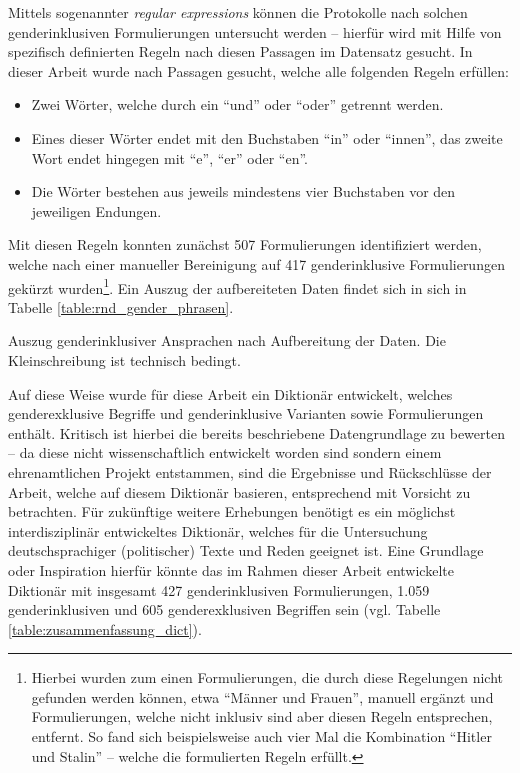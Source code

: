 \documentclass[12pt, 
    twoside=false, 
    bibliography=totoc, 
    numbers=endperiod, 
    headings=normal, 
    toc=chapterentrydotfill
    ]{scrbook}
\begin{document}
Mittels sogenannter \emph{regular expressions} \parencite{thompson_1968} können die Protokolle nach solchen genderinklusiven Formulierungen untersucht werden -- hierfür wird mit Hilfe von spezifisch definierten Regeln nach diesen Passagen im Datensatz gesucht. In dieser Arbeit wurde nach Passagen gesucht, welche alle folgenden Regeln erfüllen:
\begin{itemize}
    \setlength\itemsep{0em}
    \item Zwei Wörter, welche durch ein \enquote{und} oder \enquote{oder} getrennt werden.
    \item Eines dieser Wörter endet mit den Buchstaben \enquote{in} oder \enquote{innen}, das zweite Wort endet hingegen mit \enquote{e}, \enquote{er} oder \enquote{en}.
    \item Die Wörter bestehen aus jeweils mindestens vier Buchstaben vor den jeweiligen Endungen.
\end{itemize}

Mit diesen Regeln konnten zunächst 507 Formulierungen identifiziert werden, welche nach einer manueller Bereinigung auf 417 genderinklusive Formulierungen gekürzt wurden\footnote{Hierbei wurden zum einen Formulierungen, die durch diese Regelungen nicht gefunden werden können, etwa \enquote{Männer und Frauen}, manuell ergänzt und Formulierungen, welche nicht inklusiv sind aber diesen Regeln entsprechen, entfernt. So fand sich beispielsweise auch vier Mal die Kombination \enquote{Hitler und Stalin} -- welche die formulierten Regeln erfüllt.}. Ein Auszug der aufbereiteten Daten findet sich in sich in Tabelle \ref{table:rnd_gender_phrasen}. 

%

\begin{table}[htb]
    \centering
    \caption[Auszug genderinklusiver Ansprachen nach Aufbereitung der Daten]{Auszug genderinklusiver Ansprachen nach Aufbereitung der Daten. 
    Die Kleinschreibung ist technisch bedingt.}
    
    \label{table:rnd_gender_phrasen}
\end{table}

%

Auf diese Weise wurde für diese Arbeit ein Diktionär entwickelt, welches genderexklusive Begriffe und genderinklusive Varianten sowie Formulierungen enthält. Kritisch ist hierbei die bereits beschriebene Datengrundlage zu bewerten -- da diese nicht wissenschaftlich entwickelt worden sind sondern einem ehrenamtlichen Projekt entstammen, sind die Ergebnisse und Rückschlüsse der Arbeit, welche auf diesem Diktionär basieren, entsprechend mit Vorsicht zu betrachten.
Für zukünftige weitere Erhebungen benötigt es ein möglichst interdisziplinär entwickeltes Diktionär, welches für die Untersuchung deutschsprachiger (politischer) Texte und Reden geeignet ist. Eine Grundlage oder Inspiration hierfür könnte das im Rahmen dieser Arbeit entwickelte Diktionär mit insgesamt 427 genderinklusiven Formulierungen, 1.059 genderinklusiven und 605 genderexklusiven Begriffen sein (vgl. Tabelle \ref{table:zusammenfassung_dict}).
\end{document}
